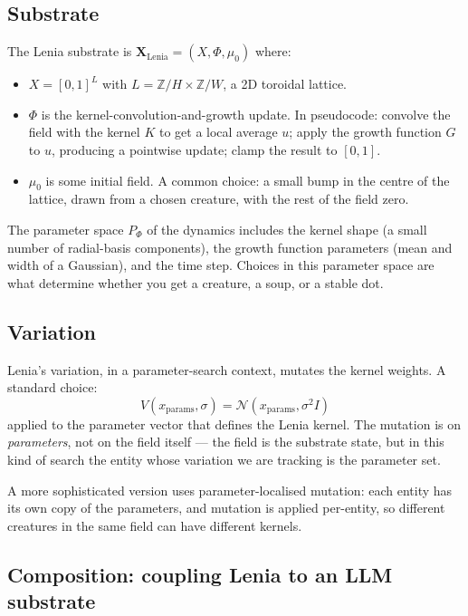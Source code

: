 \subsection*{Substrate}

The Lenia substrate is $\mathbf{X}_{\mathrm{Lenia}} = (X, \Phi, \mu_0)$
where:

\begin{itemize}[leftmargin=1.5em,itemsep=2pt]
  \item $X = [0,1]^L$ with $L = \mathbb{Z}/H \times \mathbb{Z}/W$, a 2D
    toroidal lattice.
  \item $\Phi$ is the kernel-convolution-and-growth update. In
    pseudocode: convolve the field with the kernel $K$ to get a local
    average $u$; apply the growth function $G$ to $u$, producing a
    pointwise update; clamp the result to $[0,1]$.
  \item $\mu_0$ is some initial field. A common choice: a small bump
    in the centre of the lattice, drawn from a chosen creature, with
    the rest of the field zero.
\end{itemize}

The parameter space $P_\Phi$ of the dynamics includes the kernel shape
(a small number of radial-basis components), the growth function
parameters (mean and width of a Gaussian), and the time step. Choices
in this parameter space are what determine whether you get a creature,
a soup, or a stable dot.

\subsection*{Variation}

Lenia's variation, in a parameter-search context, mutates the kernel
weights. A standard choice:
\[
  V(x_{\mathrm{params}}, \sigma) = \mathcal{N}(x_{\mathrm{params}},
  \sigma^2 I)
\]
applied to the parameter vector that defines the Lenia kernel. The
mutation is on \emph{parameters}, not on the field itself --- the
field is the substrate state, but in this kind of search the entity
whose variation we are tracking is the parameter set.

A more sophisticated version uses parameter-localised mutation: each
entity has its own copy of the parameters, and mutation is applied
per-entity, so different creatures in the same field can have
different kernels.

\subsection*{Composition: coupling Lenia to an LLM substrate}

